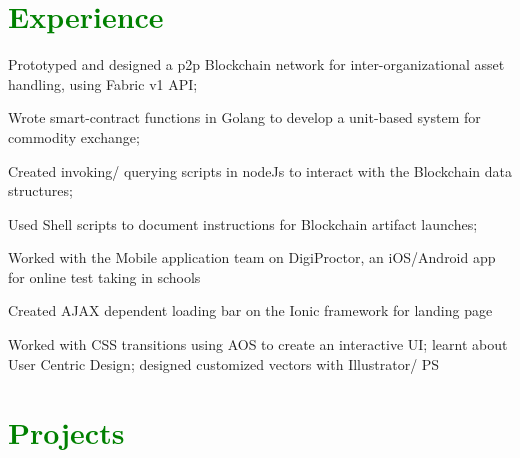 \documentclass[letterpaper]{deedy-resume-openfont} %
\begin{document}
\begin{minipage}[t]{0.66\textwidth} %


\section{\textcolor{GREEN}{Experience}}

\vspace{\topsep} %
\begin{tightemize}
\item Prototyped and designed a p2p Blockchain network for inter-organizational asset handling, using Fabric v1 API;
\item Wrote smart-contract functions in Golang to develop a unit-based system for commodity exchange;
\item Created invoking/ querying scripts in nodeJs to interact with the Blockchain data structures;
\item Used Shell scripts to document instructions for Blockchain artifact launches;
\end{tightemize}

\sectionsep %

\begin{tightemize}
\item Worked with the Mobile application team on DigiProctor, an iOS/Android app for online test taking in schools
\item Created AJAX dependent loading bar on the Ionic framework for landing page
\item Worked with CSS transitions using AOS to create an interactive UI; learnt about User Centric Design; designed customized vectors with Illustrator/ PS 
\end{tightemize}

\sectionsep %


\section{\textcolor{GREEN}{Projects}}


\end{minipage}
\end{document}
